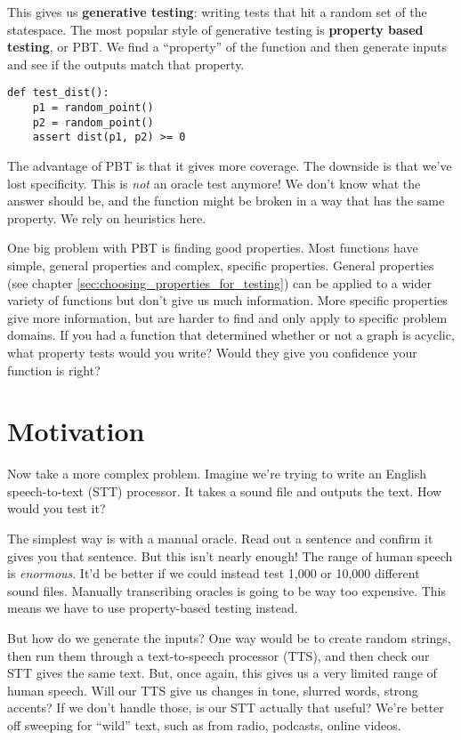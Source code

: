This gives us \textbf{generative testing}: writing tests that hit a
random set of the statespace. The most popular style of generative
testing is \textbf{property based testing}, or PBT. We find a
``property'' of the function and then generate inputs and see if the
outputs match that property.

\begin{verbatim}
def test_dist():
    p1 = random_point()
    p2 = random_point()
    assert dist(p1, p2) >= 0
\end{verbatim}
The advantage of PBT is that it gives more coverage. The downside is
that we've lost specificity. This is \emph{not} an oracle test anymore!
We don't know what the answer should be, and the function might be
broken in a way that has the same property. We rely on heuristics here.

One big problem with PBT is finding good properties. Most functions have
simple, general properties and complex, specific properties.
General properties (see chapter \ref{sec:choosing_properties_for_testing})
can be applied to a wider variety of functions but don't
give us much information. More specific properties give more
information, but are harder to find and only apply to specific problem
domains. If you had a function that determined whether or not a graph is
acyclic, what property tests would you write? Would they give you
confidence your function is right?

\section{Motivation}\label{motivation}

Now take a more complex problem. Imagine we're trying to write an
English speech-to-text (STT) processor. It takes a sound file and
outputs the text. How would you test it?

The simplest way is with a manual oracle. Read out a sentence and
confirm it gives you that sentence. But this isn't nearly enough! The
range of human speech is \emph{enormous}. It'd be better if we could
instead test 1,000 or 10,000 different sound files. Manually
transcribing oracles is going to be way too expensive. This means we
have to use property-based testing instead.

But how do we generate the inputs? One way would be to create random
strings, then run them through a text-to-speech processor (TTS), and
then check our STT gives the same text. But, once again, this gives us a
very limited range of human speech. Will our TTS give us changes in
tone, slurred words, strong accents? If we don't handle those, is our
STT actually that useful? We're better off sweeping for ``wild'' text,
such as from radio, podcasts, online videos.

